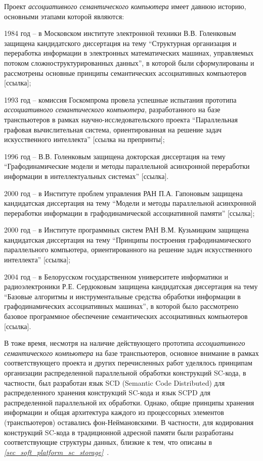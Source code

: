 Проект \textit{ассоциативного семантического компьютера} имеет давнюю историю, основными этапами которой являются:
\begin{textitemize}
\item 1984 год -- в Московском  институте электронной техники В.В. Голенковым защищена кандидатского диссертация на тему ``Структурная организация и переработка информации в электронных математических машинах, управляемых потоком сложноструктурированных данных'', в которой были сформулированы и рассмотрены основные принципы семантических ассоциативных компьютеров [ссылка];
\item 1993 год -- комиссия Госкомпрома провела успешные испытания прототипа \textit{ассоциативного семантического компьютера}, разработанного на базе транспьютеров в рамках научно-исследовательского проекта ``Параллельная графовая вычислительная система, ориентированная на решение задач искусственного интеллекта'' [ссылка на препринты];
\item 1996 год -- В.В. Голенковым защищена докторская диссертация на тему ``Графодинамические модели и методы параллельной асинхронной переработки информации в интеллектуальных системах'' [ссылка]. 
\item 2000 год -- в Институте проблем управления РАН П.А. Гапоновым защищена кандидатская диссертация на тему ``Модели и методы параллельной асинхронной переработки информации в графодинамической ассоциативной памяти'' [ссылка];
\item 2000 год -- в Институте программных систем РАН В.М. Кузьмицким защищена кандидатская диссертация на тему ``Принципы построения графодинамического параллельного компьютера, ориентированного на решение задач искусственного интеллекта'' [ссылка];
\item 2004 год -- в Белорусском государственном университете информатики и радиоэлектроники Р.Е. Сердюковым защищена кандидатская диссертация на тему ``Базовые алгоритмы и инструментальные средства обработки информации в графодинамических ассоциативных машинах'', в которой было рассмотрено базовое программное обеспечение семантических ассоциативных компьютеров [ссылка].
\end{textitemize}

В тоже время, несмотря на наличие действующего прототипа \textit{ассоциативного семантического компьютера} на базе транспьютеров, основное внимание в рамках соответствующего проекта и других перечисленных работ уделялось принципам организации распределенной параллельной обработки конструкций SC-кода, в частности, был разработан язык SCD (Semantic Code Distributed) для распределенного хранения конструкций SC-кода и язык SCPD для распределенной параллельной их обработки. Однако, общие принципы хранения информации и общая архитектура каждого из процессорных элементов (транспьютеров) оставались фон-Неймановскими. В частности, для кодирования конструкций SC-кода в традиционной адресной памяти были разработаны соответствующие структуры данных, близкие к тем, что описаны в \textit{\ref{sec_soft_platform_sc_storage}~}.

